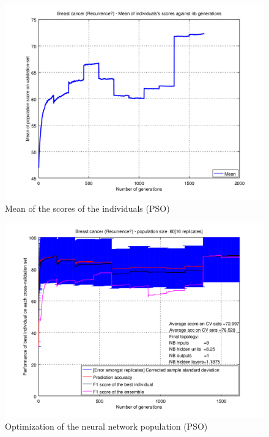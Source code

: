 \documentclass[a4paper,12pt, oneside]{memoir}
\begin{document}
\begin{figure}[h]
  \centering
  \includegraphics[scale=0.7]{recurrence-meanVSepochs-PSO}
  \vspace{-12pt}
  \caption{Mean of the scores of the individuals (PSO)}
  \label{recurrence-mean-PSO}
\end{figure}

\clearpage

\begin{figure}[h]
  \centering
  \includegraphics[scale=0.7]{recurrence-performancesVSepochs-PSO}
  \vspace{-12pt}
  \caption{Optimization of the neural network population (PSO)}
  \label{recurrence-perfs-PSO}
\end{figure}
\end{document}
